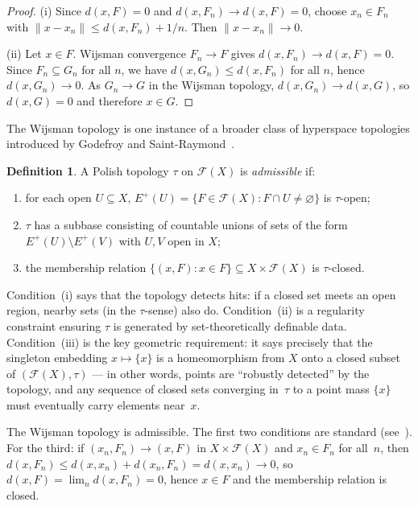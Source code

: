 \documentclass[12pt,fleqn,a4paper]{amsart}
\renewcommand{\le}{\leqslant}
\numberwithin{equation}{section}
\theoremstyle{definition}
\newtheorem{definition}[theorem]{Definition}
\begin{document}
\begin{proof}
(i) Since $d(x,F)=0$ and $d(x,F_n)\to d(x,F)=0$, choose $x_n\in F_n$ with
$\|x-x_n\|\le d(x,F_n)+1/n$.  Then $\|x-x_n\|\to 0$.

(ii) Let $x\in F$.  Wijsman convergence $F_n\to F$ gives $d(x,F_n)\to d(x,F)=0$.
Since $F_n\subseteq G_n$ for all $n$, we have $d(x,G_n)\le d(x,F_n)$ for all $n$,
hence $d(x,G_n)\to 0$.  As $G_n\to G$ in the Wijsman topology,
$d(x,G_n)\to d(x,G)$, so $d(x,G)=0$ and therefore $x\in G$.
\end{proof}

The Wijsman topology is one instance of a broader class of
hyperspace topologies introduced by Godefroy and
Saint-Raymond~\cite{GodefroySaintRaymond2018}.

\begin{definition}
\label{def:admissible}
A Polish topology $\tau$ on $\mathscr F(X)$ is \emph{admissible} if:
\begin{enumerate}
\item for each open $U\subseteq X$,
$E^+(U)=\{F\in\mathscr F(X):F\cap U\ne\varnothing\}$ is $\tau$-open;
\item $\tau$ has a subbase consisting of countable unions of sets of the form
$E^+(U)\setminus E^+(V)$ with $U,V$ open in $X$;
\item the membership relation $\{(x,F):x\in F\}\subseteq X\times\mathscr F(X)$
is $\tau$-closed.
\end{enumerate}
\end{definition}

Condition~(i) says that the topology detects hits:
if a closed set meets an open region, nearby sets (in the $\tau$-sense) also
do.  Condition~(ii) is a regularity constraint ensuring $\tau$
is generated by set-theoretically definable data.
Condition~(iii) is the key geometric requirement: it says precisely that the
singleton embedding $x\mapsto \{x\}$ is a homeomorphism from $X$ onto a
closed subset of $(\mathscr F(X),\tau)$ --- in other words, points are
``robustly detected'' by the topology, and any sequence of closed sets converging
in~$\tau$ to a point mass $\{x\}$ must eventually carry elements near~$x$.

The Wijsman topology is admissible.
The first two conditions are standard (see~\cite{Beer}).  For the third:
if $(x_n,F_n)\to(x,F)$ in $X\times\mathscr F(X)$ and $x_n\in F_n$ for all~$n$,
then $d(x,F_n)\le d(x,x_n)+d(x_n,F_n)=d(x,x_n)\to 0$,
so $d(x,F)=\lim_n d(x,F_n)=0$, hence $x\in F$ and the membership relation is closed.
\end{document}
